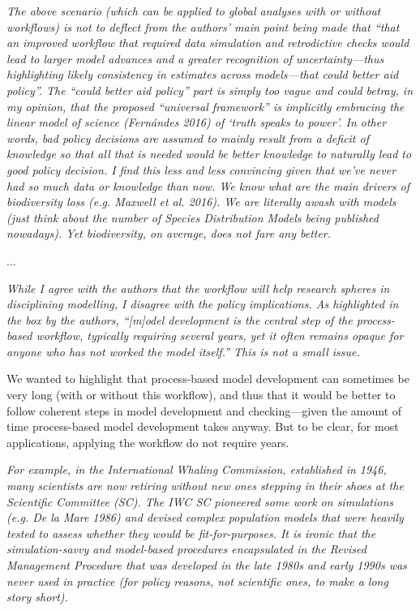 \documentclass[11pt,letter]{article}
\begin{document}
\begin{mybox}
\emph{The above scenario (which can be applied to global analyses with or without workflows) is not
to deflect from the authors’ main point being made that “that an improved workflow that
required data simulation and retrodictive checks would lead to larger model advances and a
greater recognition of uncertainty—thus highlighting likely consistency in estimates across
models—that could better aid policy”. The “could better aid policy” part is simply too vague
and could betray, in my opinion, that the proposed “universal framework” is implicitly
embracing the linear model of science (Fernándes 2016) of ‘truth speaks to power’. In other
words, bad policy decisions are assumed to mainly result from a deficit of knowledge so that
all that is needed would be better knowledge to naturally lead to good policy decision. I find
this less and less convincing given that we’ve never had so much data or knowledge than now.
We know what are the main drivers of biodiversity loss (e.g. Maxwell et al. 2016). We are
literally awash with models (just think about the number of Species Distribution Models being
published nowadays). Yet biodiversity, on average, does not fare any better.}  
\end{mybox}

...

\begin{mybox}
\emph{While I agree with the authors that the workflow will help research spheres in disciplining
modelling, I disagree with the policy implications. As highlighted in the box by the authors,
“[m]odel development is the central step of the process-based workflow, typically requiring
several years, yet it often remains opaque for anyone who has not worked the model itself.”
This is not a small issue.}  
\end{mybox}

We wanted to highlight that process-based model development can sometimes be very long (with or without this workflow), and thus that it would be better to follow coherent steps in model development and checking---given the amount of time process-based model development takes anyway. But to be clear, for most applications, applying the workflow do not require years.

\begin{mybox}
\emph{For example, in the International Whaling Commission, established in
1946, many scientists are now retiring without new ones stepping in their shoes at the Scientific
Committee (SC). The IWC SC pioneered some work on simulations (e.g. De la Mare 1986) and
devised complex population models that were heavily tested to assess whether they would be
fit-for-purposes. It is ironic that the simulation-savvy and model-based procedures
encapsulated in the Revised Management Procedure that was developed in the late 1980s and
early 1990s was never used in practice (for policy reasons, not scientific ones, to make a long
story short).}  
\end{mybox}
\end{document}
